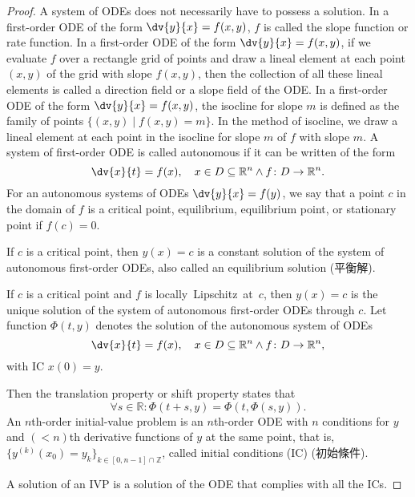 \documentclass[a4paper,12pt]{report}
\begin{document}
\begin{itemize}
\begin{itemize}
\begin{proof}
A system of ODEs does not necessarily have to possess a solution.
In a first-order ODE of the form $\dv{y}{x}=f(x,y)$, $f$ is called the slope function or rate function.
In a first-order ODE of the form $\dv{y}{x}=f(x,y)$, if we evaluate $f$ over a rectangle grid of points and draw a lineal element at each point $(x,y)$ of the grid with slope $f(x,y)$, then the collection of all these lineal elements is called a direction field or a slope field of the ODE.
In a first-order ODE of the form $\dv{y}{x}=f(x,y)$, the isocline for slope $m$ is defined as the family of points $\{(x,y)\mid f(x,y)=m\}$. In the method of isocline, we draw a lineal element at each point in the isocline for slope $m$ of $f$ with slope $m$.
A system of first-order ODE is called autonomous if it can be written of the form
\[\dv{x}{t}=f(x),\quad x\in D\subseteq\mathbb{R}^n\land f\colon D\to\mathbb{R}^n.\]
For an autonomous systems of ODEs $\dv{y}{x}=f(y)$, we say that a point $c$ in the domain of $f$ is a critical point, equilibrium, equilibrium point, or stationary point if $f(c)=0$.

If $c$ is a critical point, then $y(x)=c$ is a constant solution of the system of autonomous first-order ODEs, also called an equilibrium solution (平衡解).

If $c$ is a critical point and $f$ is locally Lipschitz at $c$, then $y(x)=c$ is the unique solution of the system of autonomous first-order ODEs through $c$.
Let function $\Phi(t,y)$ denotes the solution of the autonomous system of ODEs
\[\dv{x}{t}=f(x),\quad x\in D\subseteq\mathbb{R}^n\land f\colon D\to\mathbb{R}^n,\]
with IC $x(0)=y$.

Then the translation property or shift property states that
\[\forall s\in\mathbb{R}\colon\Phi(t+s,y)=\Phi(t,\Phi(s,y)).\]
An $n$th-order initial-value problem is an $n$th-order ODE with $n$ conditions for $y$ and $(<n)$th derivative functions of $y$ at the same point, that is, $\{y^{(k)}(x_0)=y_k\}_{k\in[0,n-1]\cap\mathbb{Z}}$, called initial conditions (IC) (初始條件).

A solution of an IVP is a solution of the ODE that complies with all the ICs.


\end{proof}
\end{itemize}
\end{itemize}
\end{document}
